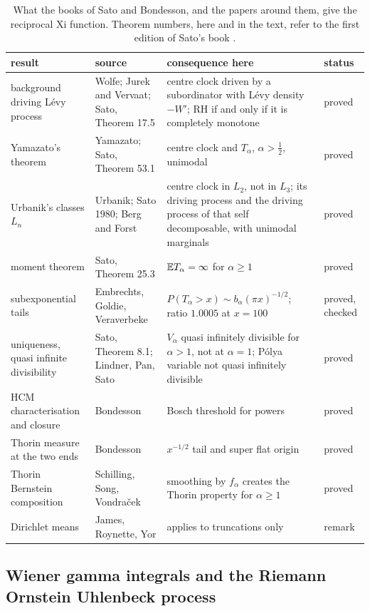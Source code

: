 \begin{table}[htbp]
\centering\small
\begin{tabular}{p{}p{}p{}p{}}
\toprule
result & source & consequence here & status\tabularnewline
\midrule
\raggedright background driving L\'evy process & \raggedright Wolfe; Jurek and Vervaat; Sato, Theorem 17.5 & \raggedright centre clock driven by a subordinator with L\'evy density $-W'$; RH if and only if it is completely monotone & proved\tabularnewline
\raggedright Yamazato's theorem & \raggedright Yamazato; Sato, Theorem 53.1 & \raggedright centre clock and $T_\alpha$, $\alpha>\frac12$, unimodal & proved\tabularnewline
\raggedright Urbanik's classes $L_n$ & \raggedright Urbanik; Sato 1980; Berg and Forst & \raggedright centre clock in $L_2$, not in $L_3$; its driving process and the driving process of that self decomposable, with unimodal marginals & proved\tabularnewline
\raggedright moment theorem & \raggedright Sato, Theorem 25.3 & \raggedright $\mathbb{E} T_\alpha=\infty$ for $\alpha\ge1$ & proved\tabularnewline
\raggedright subexponential tails & \raggedright Embrechts, Goldie, Veraverbeke & \raggedright $P(T_\alpha>x)\sim b_\alpha(\pi x)^{-1/2}$; ratio $1.0005$ at $x=100$ & \raggedright proved, checked\tabularnewline
\raggedright uniqueness, quasi infinite divisibility & \raggedright Sato, Theorem 8.1; Lindner, Pan, Sato & \raggedright $V_\alpha$ quasi infinitely divisible for $\alpha>1$, not at $\alpha=1$; P\'olya variable not quasi infinitely divisible & proved\tabularnewline
\raggedright HCM characterisation and closure & \raggedright Bondesson & \raggedright Bosch threshold for powers & proved\tabularnewline
\raggedright Thorin measure at the two ends & \raggedright Bondesson & \raggedright $x^{-1/2}$ tail and super flat origin & proved\tabularnewline
\raggedright Thorin Bernstein composition & \raggedright Schilling, Song, Vondra\v{c}ek & \raggedright smoothing by $f_\alpha$ creates the Thorin property for $\alpha\ge1$ & proved\tabularnewline
\raggedright Dirichlet means & \raggedright James, Roynette, Yor & \raggedright applies to truncations only & remark\tabularnewline
\bottomrule
\end{tabular}
\caption{What the books of Sato and Bondesson, and the papers around them, give the reciprocal Xi function. Theorem numbers, here and in the text, refer to the first edition of Sato's book \cite{Sato99}.}
\label{sb:tab:results}
\end{table}

\subsection{Wiener gamma integrals and the Riemann Ornstein Uhlenbeck process}\label{pm:sec:wg}

